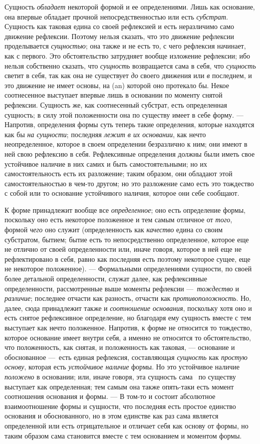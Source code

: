 Сущность {\em обладает} некоторой формой и ее
определениями. Лишь как основание, она впервые обладает прочной
непосредственностью или есть {\em субстрат}. Сущность
как таковая едина со своей рефлексией и есть неразличимо само движение
рефлексии. Поэтому нельзя сказать, что это движение рефлексии проделывается
{\em сущностью}; она также и не есть то, с чего
рефлексия начинает, как с первого. Это обстоятельство затрудняет вообще
изложение рефлексии; ибо нельзя собственно сказать, что
{\em сущность} возвращается сама в себя, что
{\em сущность} светит в себя, так как она не существует
{\em до} своего движения или
{\em в} последнем, и это движение не имеет основы, на
(an) которой оно протекало бы. Некое соотнесенное выступает впервые лишь в
основании по моменту снятой рефлексии. Сущность же, как соотнесенный
субстрат, есть определенная сущность; в силу этой положенности она по
существу имеет в себе форму. — Напротив, определения формы суть теперь
такие определения, которые находятся как бы {\em на
сущности}; последняя {\em лежит в их основании}, как
нечто неопределенное, которое в своем определении безразлично к ним; они
имеют в ней свою рефлексию в себя. Рефлексивные определения должны были
иметь свое устойчивое наличие в них самих и быть самостоятельными; но их
самостоятельность есть их разложение; таким образом, они обладают этой
самостоятельностью в чем-то другом; но это разложение само есть это
тождество с собой или то основание устойчивого наличия, которое они себе
сообщают.

К форме принадлежит вообще все {\em определенное}; оно
есть определение формы, поскольку оно есть некоторое положенное и тем самым
отличное от {\em того}, формой
{\em чего} оно служит (определенность как
{\em качество} едина со своим субстратом, бытием; бытие
есть то непосредственно определенное, которое еще не отлично от своей
определенности или, иначе говоря, которое в ней еще не рефлектировано в
себя, равно как последняя есть поэтому некоторое сущее, еще не некоторое
положенное). — Формальными определениями сущности, по своей более детальной
определенности, служат далее, как рефлексивные определенности,
рассмотренные выше моменты рефлексии —~{\em тождество}
и {\em различие}; последнее отчасти как разность,
отчасти как {\em противоположность}. Но, далее, сюда
принадлежит также и {\em соотношение основания},
поскольку хотя оно и есть снятое рефлексивное определение, но благодаря ему
сущность вместе с тем выступает как нечто положенное. Напротив, к форме не
относится то тождество, которое основание имеет внутри себя, а именно не
относится то обстоятельство, что положенность, как снятая, и положенность
как таковая, — основание и обоснованное —~есть единая рефлексия,
составляющая {\em сущность} как
{\em простую основу}, которая есть
{\em устойчивое наличие} формы. Но это устойчивое
наличие {\em положено} в основании; или, иначе говоря,
эта сущность сама \ по существу выступает как определенная; тем самым она
также опять-таки есть момент соотношения основания и формы. — В том-то и
состоит абсолютное взаимоотношение формы и сущности, что последняя есть
простое единство основания и обоснованного, но в этом единстве как раз сама
является определенной или есть отрицательное и отличает себя как основу от
формы, но таким образом сама становится вместе с тем основанием и моментом
формы.

